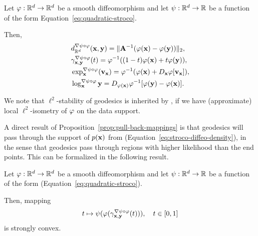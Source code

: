 \begin{proposition}
\label{prop:pull-back-mappings}
    Let $\varphi:\mathbb{R}^d \to \mathbb{R}^d$ be a smooth diffeomorphism and let $\psi: \mathbb{R}^d \to \mathbb{R}$ be a function of the form Equation~\ref{eq:quadratic-stroco}.

    Then,
    \begin{align}
        &d^{\nabla \psi \circ \varphi}_{\mathbb{R}^d}(\mathbf{x}, \mathbf{y}) = \| \mathbf{A}^{-1} (\varphi(\mathbf{x}) -  \varphi(\mathbf{y}))\|_{2},
        \label{eq:thm-distance-remetrized-special-psi} \\
        &\gamma^{\nabla \psi \circ \varphi}_{\mathbf{x}, \mathbf{y}}(t) = \varphi^{-1}((1 - t)\varphi(\mathbf{x}) + t \varphi(\mathbf{y})),
        \label{eq:thm-geodesic-remetrized-special-psi}\\
        &\exp^{\nabla \psi \circ \varphi}_{\mathbf{x}} (\mathbf{v}_{\mathbf{x}}) = \varphi^{-1}(\varphi(\mathbf{x}) + D_{\mathbf{x}} \varphi[\mathbf{v}_{\mathbf{x}}]),
        \label{eq:thm-exp-remetrized-special-psi}\\
        &\log^{\nabla \psi \circ \varphi}_{\mathbf{x}} \mathbf{y} = D_{\varphi(\mathbf{x})}\varphi^{-1}[\varphi(\mathbf{y}) - \varphi(\mathbf{x})].
        \label{eq:thm-log-remetrized-special-psi}
    \end{align}
\end{proposition}


\begin{remark}
\label{rem:stability-manifold-mappings}
    We note that $\ell^2$-stability of geodesics is inherited by \cite[Thm.~3.4]{diepeveen2024pulling}, if we have (approximate) local $\ell^2$-isometry of $\varphi$ on the data support.
\end{remark}

A direct result of Proposition~\ref{prop:pull-back-mappings} is that geodesics will pass through the support of $p(\mathbf{x})$ from (Equation~\ref{eq:stroco-diffeo-density}), in the sense that geodesics pass through regions with higher likelihood than the end points. This can be formalized in the following result.
\begin{theorem}
\label{thm:strong-geodesic-convexity}
    Let $\varphi:\mathbb{R}^d \to \mathbb{R}^d$ be a smooth diffeomorphism and let $\psi: \mathbb{R}^d \to \mathbb{R}$ be a function of the form (Equation~\ref{eq:quadratic-stroco}). 
    
    Then, mapping 
    \begin{equation}
        t \mapsto \psi(\varphi(\gamma^{\nabla \psi \circ \varphi}_{\mathbf{x}, \mathbf{y}}(t))), \quad t \in [0,1]
        \label{eq:mapping-conexity-theorem}
    \end{equation}
    is strongly convex.
\end{theorem}


